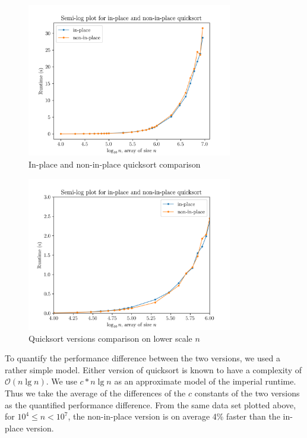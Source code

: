 \documentclass[titlepage, 12pt]{article}
\begin{document}
\begin{figure}[h]
  \centering
  \includegraphics[width=0.8\textwidth]{ip-ax}
  \caption{In-place and non-in-place quicksort comparison}
  \label{fig:ip-ax}
\end{figure}
\begin{figure}[h]
  \centering
  \includegraphics[width=0.8\textwidth]{ip-ax-zoomed} 
  \caption{Quicksort versions comparison on lower scale \( n \)}
  \label{fig:ip-ax-zoomed}
\end{figure}

To quantify the performance difference between the two versions, we used a
rather simple model. Either version of quicksort is known to have a complexity
of \( \mathcal{O}(n\lg{n}) \). We use \( c * n\lg{n} \) as an approximate model
of the imperial runtime. Thus we take the average of the differences of the \( c
\) constants of the two versions as the quantified performance difference. From
the same data set plotted above, for \( 10^4 \leq n < 10^7 \), the non-in-place
version is on average 4\% faster than the in-place version.
\end{document}
